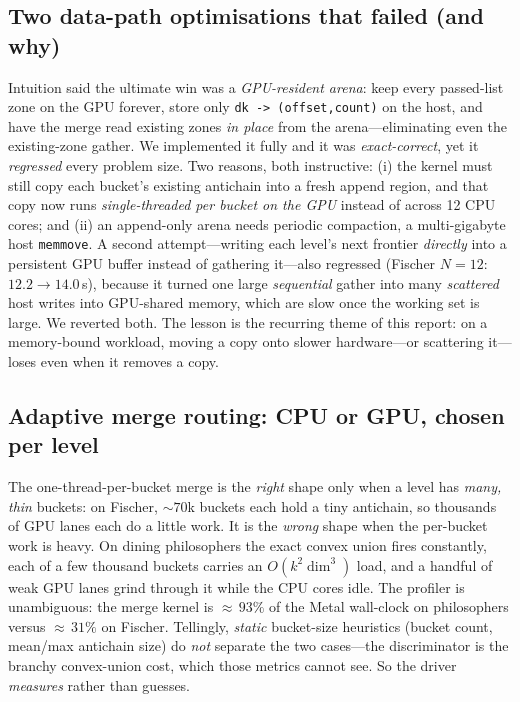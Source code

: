 \documentclass[11pt]{article}
\newcommand{\code}[1]{\texttt{\small #1}}
\begin{document}
\subsection{Two data-path optimisations that failed (and why)}\label{sec:failed}
Intuition said the ultimate win was a \emph{GPU-resident arena}: keep every passed-list zone on the
GPU forever, store only \code{dk -> (offset,count)} on the host, and have the merge read existing
zones \emph{in place} from the arena---eliminating even the existing-zone gather. We implemented it
fully and it was \emph{exact-correct}, yet it \emph{regressed} every problem size. Two reasons,
both instructive: (i) the kernel must still copy each bucket's existing antichain into a fresh
append region, and that copy now runs \emph{single-threaded per bucket on the GPU} instead of
across 12 CPU cores; and (ii) an append-only arena needs periodic compaction, a multi-gigabyte host
\code{memmove}. A second attempt---writing each level's next frontier \emph{directly} into a
persistent GPU buffer instead of gathering it---also regressed (Fischer $N{=}12$: $12.2\!\to\!14.0$\,s),
because it turned one large \emph{sequential} gather into many \emph{scattered} host writes into
GPU-shared memory, which are slow once the working set is large. We reverted both. The lesson is the
recurring theme of this report: on a memory-bound workload, moving a copy onto slower hardware---or
scattering it---loses even when it removes a copy.

\subsection{Adaptive merge routing: CPU or GPU, chosen per level}\label{sec:adaptive}
The one-thread-per-bucket merge is the \emph{right} shape only when a level has \emph{many, thin}
buckets: on Fischer, ${\sim}70$k buckets each hold a tiny antichain, so thousands of GPU lanes each do
a little work. It is the \emph{wrong} shape when the per-bucket work is heavy. On dining philosophers
the exact convex union fires constantly, each of a few thousand buckets carries an $O(k^2\dim^3)$
load, and a handful of weak GPU lanes grind through it while the CPU cores idle. The profiler is
unambiguous: the merge kernel is ${\approx}\,93\%$ of the Metal wall-clock on philosophers versus
${\approx}\,31\%$ on Fischer. Tellingly, \emph{static} bucket-size heuristics (bucket count,
mean/max antichain size) do \emph{not} separate the two cases---the discriminator is the branchy
convex-union cost, which those metrics cannot see. So the driver \emph{measures} rather than guesses.
\end{document}
